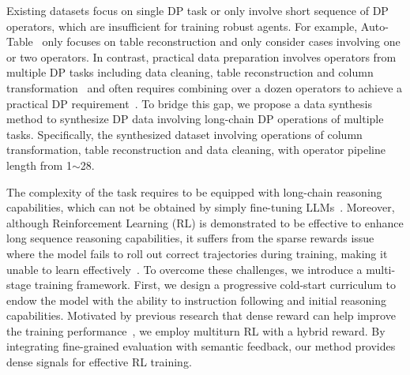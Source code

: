 Existing datasets focus on single DP task or only involve short sequence of DP operators, which are insufficient for training robust agents. For example, Auto-Table~\cite{DBLP:journals/pvldb/LiHYWC23} only focuses on table reconstruction and only consider cases involving one or two operators. In contrast, practical data preparation involves operators from {multiple DP tasks} including data cleaning, table reconstruction and column transformation~\cite{heer2015predictive} and often requires combining over {a dozen operators} to achieve a practical DP requirement~\cite{2011-wrangler}.
To bridge this gap, we propose a data synthesis method to synthesize DP data involving long-chain DP operations of multiple tasks. 
Specifically, the synthesized dataset involving operations of column transformation, table reconstruction and data cleaning, with operator pipeline length from 1$\sim$28.


The complexity of the task requires \sys to be equipped with long-chain reasoning capabilities, which can not be obtained by simply fine-tuning LLMs~\cite{xie2025logic}. Moreover, although Reinforcement Learning (RL) is demonstrated to be effective to enhance long sequence reasoning capabilities, it suffers from the {sparse rewards} issue where the model fails to roll out correct trajectories during training, making it unable to learn effectively~\cite{gao2024designing}.
To overcome these challenges, we introduce a multi-stage training framework.
First, we design a {progressive cold-start curriculum} to endow the model with the ability to instruction following and initial reasoning capabilities.
Motivated by previous research that dense reward can help improve the training performance~\cite{gao2024designing}, we employ {multiturn RL with a hybrid reward}. By integrating fine-grained evaluation with semantic feedback, our method provides dense signals for effective RL training.

